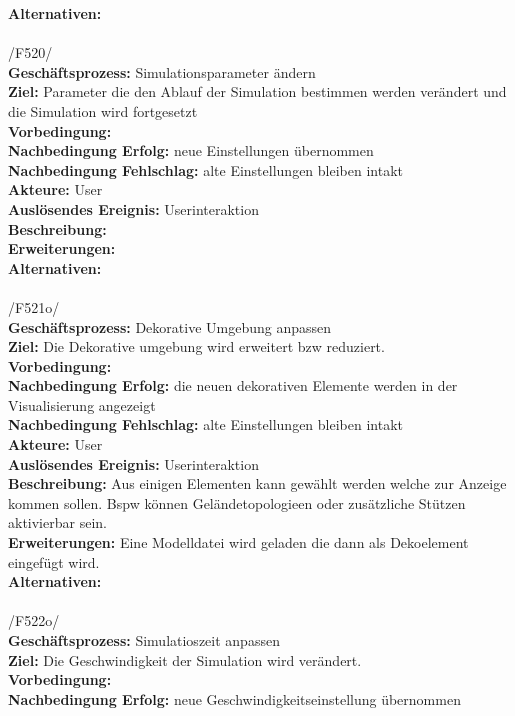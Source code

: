 \textbf{Alternativen:}\\
\\
/F520/\\
\textbf{Geschäftsprozess:} Simulationsparameter ändern\\
\textbf{Ziel:} Parameter die den Ablauf der Simulation bestimmen werden verändert und die Simulation wird fortgesetzt\\
\textbf{Vorbedingung:}  \\
\textbf{Nachbedingung Erfolg:} neue Einstellungen übernommen\\
\textbf{Nachbedingung Fehlschlag:} alte Einstellungen bleiben intakt\\
\textbf{Akteure:} User\\
\textbf{Auslösendes Ereignis:} Userinteraktion\\
\textbf{Beschreibung:} \\
\textbf{Erweiterungen:}\\
\textbf{Alternativen:}\\
\\
/F521o/\\
\textbf{Geschäftsprozess:} Dekorative Umgebung anpassen\\
\textbf{Ziel:} Die Dekorative umgebung wird erweitert bzw reduziert.\\
\textbf{Vorbedingung:} \\
\textbf{Nachbedingung Erfolg:} die neuen dekorativen Elemente werden in der Visualisierung angezeigt\\
\textbf{Nachbedingung Fehlschlag:} alte Einstellungen bleiben intakt\\
\textbf{Akteure:} User\\
\textbf{Auslösendes Ereignis:} Userinteraktion\\
\textbf{Beschreibung:} Aus einigen Elementen kann gewählt werden welche zur Anzeige kommen sollen. Bspw können Geländetopologieen oder zusätzliche Stützen aktivierbar sein.\\
\textbf{Erweiterungen:} Eine Modelldatei wird geladen die dann als Dekoelement eingefügt wird.\\
\textbf{Alternativen:}\\
\\
/F522o/\\
\textbf{Geschäftsprozess:} Simulatioszeit anpassen\\
\textbf{Ziel:} Die Geschwindigkeit der Simulation wird verändert.\\
\textbf{Vorbedingung:} \\
\textbf{Nachbedingung Erfolg:} neue Geschwindigkeitseinstellung übernommen\\
